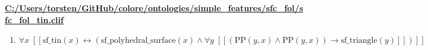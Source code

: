\documentclass{article}
\begin{document}
\textbf{\url{C:/Users/torsten/GitHub/colore/ontologies/simple\_features/sfc\_fol/sfc\_fol\_tin.clif}}

\begin{enumerate}
\item $\forall x\;  \left[ \left[ \textrm{sf\_tin}(x) \leftrightarrow \left(\textrm{sf\_polyhedral\_surface}(x) \land \forall y\;  \left[ \left[ \left(\textrm{PP}(y,x) \land \textrm{PP}(y,x)\right) \rightarrow \textrm{sf\_triangle}(y) \right] \right]\right) \right] \right]$
\end{enumerate}
\end{document}

